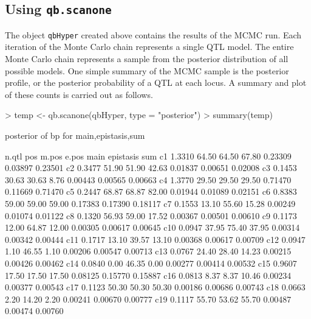 \documentclass[12pt]{article}
\begin{document}
\subsection{Using {\tt qb.scanone}}
The object {\tt qbHyper} created above contains the results of the MCMC 
run.  Each iteration of the Monte Carlo chain represents a single QTL 
model.  The entire Monte Carlo chain represents a sample from the 
posterior distribution of all possible models.  One simple summary of 
the MCMC sample is the posterior profile, or the
posterior probability of a QTL at each locus.  A summary and plot of
these counts is carried out as follows.
\begin{Schunk}
\begin{Sinput}
> temp <- qb.scanone(qbHyper, type = "posterior")
> summary(temp)
\end{Sinput}
\begin{Soutput}
posterior of bp for main,epistasis,sum 

     n.qtl   pos m.pos e.pos    main epistasis     sum
c1  1.3310 64.50 64.50 67.80 0.23309   0.03897 0.23501
c2  0.3477 51.90 51.90 42.63 0.01837   0.00651 0.02008
c3  0.1453 30.63 30.63  8.76 0.00443   0.00565 0.00663
c4  1.3770 29.50 29.50 29.50 0.71470   0.11669 0.71470
c5  0.2447 68.87 68.87 82.00 0.01944   0.01089 0.02151
c6  0.8383 59.00 59.00 59.00 0.17383   0.17390 0.18117
c7  0.1553 13.10 55.60 15.28 0.00249   0.01074 0.01122
c8  0.1320 56.93 59.00 17.52 0.00367   0.00501 0.00610
c9  0.1173 12.00 64.87 12.00 0.00305   0.00617 0.00645
c10 0.0947 37.95 75.40 37.95 0.00314   0.00342 0.00444
c11 0.1717 13.10 39.57 13.10 0.00368   0.00617 0.00709
c12 0.0947  1.10 46.55  1.10 0.00206   0.00547 0.00713
c13 0.0767 24.40 28.40 14.23 0.00215   0.00426 0.00462
c14 0.0840  0.00 46.35  0.00 0.00277   0.00414 0.00532
c15 0.9607 17.50 17.50 17.50 0.08125   0.15770 0.15887
c16 0.0813  8.37  8.37 10.46 0.00234   0.00377 0.00543
c17 0.1123 50.30 50.30 50.30 0.00186   0.00686 0.00743
c18 0.0663  2.20 14.20  2.20 0.00241   0.00670 0.00777
c19 0.1117 55.70 53.62 55.70 0.00487   0.00474 0.00760
\end{Soutput}
\end{Schunk}
\end{document}
